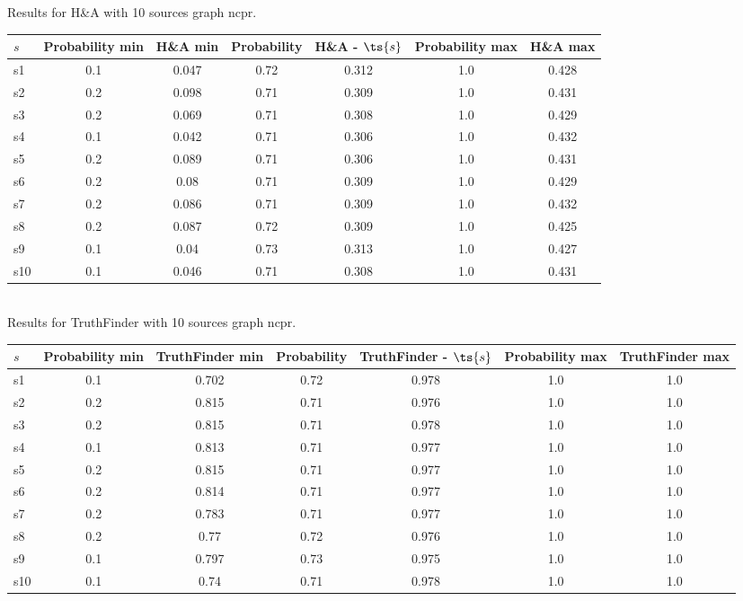 \documentclass{article}
\begin{document}
\noindent Results for H\&A with 10 sources graph ncpr.

\noindent\begin{tabular}{|l|c|c|c|c|c|c|}
\hline
$s$& Probability min & H\&A min & Probability & H\&A - $\ts{s}$ & Probability max & H\&A max\\
\hline
s1 &0.1 & 0.047 & 0.72 & 0.312 & 1.0 & 0.428\\
\hline
s2 &0.2 & 0.098 & 0.71 & 0.309 & 1.0 & 0.431\\
\hline
s3 &0.2 & 0.069 & 0.71 & 0.308 & 1.0 & 0.429\\
\hline
s4 &0.1 & 0.042 & 0.71 & 0.306 & 1.0 & 0.432\\
\hline
s5 &0.2 & 0.089 & 0.71 & 0.306 & 1.0 & 0.431\\
\hline
s6 &0.2 & 0.08 & 0.71 & 0.309 & 1.0 & 0.429\\
\hline
s7 &0.2 & 0.086 & 0.71 & 0.309 & 1.0 & 0.432\\
\hline
s8 &0.2 & 0.087 & 0.72 & 0.309 & 1.0 & 0.425\\
\hline
s9 &0.1 & 0.04 & 0.73 & 0.313 & 1.0 & 0.427\\
\hline
s10 &0.1 & 0.046 & 0.71 & 0.308 & 1.0 & 0.431\\
\hline
\end{tabular}\\

\noindent Results for TruthFinder with 10 sources graph ncpr.

\noindent\begin{tabular}{|l|c|c|c|c|c|c|}
\hline
$s$& Probability min & TruthFinder min & Probability & TruthFinder - $\ts{s}$ & Probability max & TruthFinder max\\
\hline
s1 &0.1 & 0.702 & 0.72 & 0.978 & 1.0 & 1.0\\
\hline
s2 &0.2 & 0.815 & 0.71 & 0.976 & 1.0 & 1.0\\
\hline
s3 &0.2 & 0.815 & 0.71 & 0.978 & 1.0 & 1.0\\
\hline
s4 &0.1 & 0.813 & 0.71 & 0.977 & 1.0 & 1.0\\
\hline
s5 &0.2 & 0.815 & 0.71 & 0.977 & 1.0 & 1.0\\
\hline
s6 &0.2 & 0.814 & 0.71 & 0.977 & 1.0 & 1.0\\
\hline
s7 &0.2 & 0.783 & 0.71 & 0.977 & 1.0 & 1.0\\
\hline
s8 &0.2 & 0.77 & 0.72 & 0.976 & 1.0 & 1.0\\
\hline
s9 &0.1 & 0.797 & 0.73 & 0.975 & 1.0 & 1.0\\
\hline
s10 &0.1 & 0.74 & 0.71 & 0.978 & 1.0 & 1.0\\
\hline
\end{tabular}\\
\end{document}
